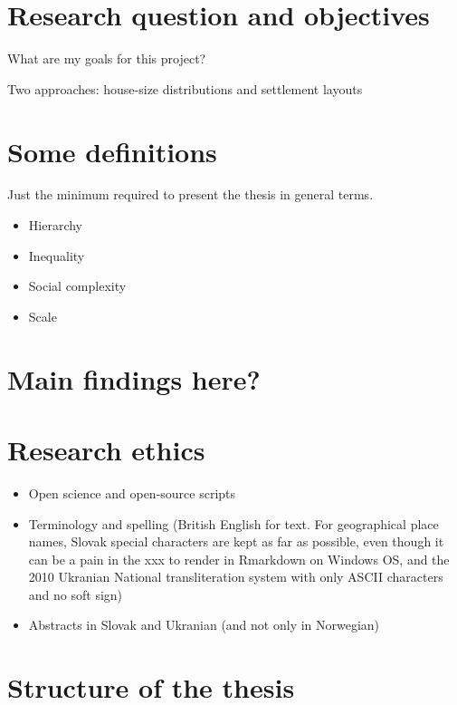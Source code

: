\documentclass[
  12pt,
]{book}
\begin{document}
\hypertarget{research-question-and-objectives}{%
\section{Research question and objectives}\label{research-question-and-objectives}}

What are my goals for this project?

Two approaches: house-size distributions and settlement layouts

\hypertarget{some-definitions}{%
\section{Some definitions}\label{some-definitions}}

Just the minimum required to present the thesis in general terms.

\begin{itemize}
\item
  Hierarchy
\item
  Inequality
\item
  Social complexity
\item
  Scale
\end{itemize}

\hypertarget{main-findings-here}{%
\section{Main findings here?}\label{main-findings-here}}

\hypertarget{research-ethics}{%
\section{Research ethics}\label{research-ethics}}

\begin{itemize}
\item
  Open science and open-source scripts
\item
  Terminology and spelling (British English for text. For geographical place names, Slovak special characters are kept as far as possible, even though it can be a pain in the xxx to render in Rmarkdown on Windows OS, and the 2010 Ukranian National transliteration system with only ASCII characters and no soft sign)
\item
  Abstracts in Slovak and Ukranian (and not only in Norwegian)
\end{itemize}

\hypertarget{structure-of-the-thesis}{%
\section{Structure of the thesis}\label{structure-of-the-thesis}}
\end{document}
